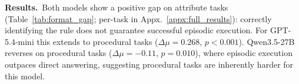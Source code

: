 \documentclass[11pt]{article}
\newcommand\jl[1]{\todo[color=blue!40]{{\bf Jessy}: #1}}
\begin{document}
%
%



\noindent\textbf{Results.}~Both models show a positive gap on attribute tasks (Table~\ref{tab:format_gap}; per-task in Appx.~\ref{appx:full_results}): correctly identifying the rule does not guarantee successful episodic execution. For GPT-5.4-mini this extends to procedural tasks ($\Delta\mu{=}0.268$, $p{<}0.001$). Qwen3.5-27B reverses on procedural tasks ($\Delta\mu{=}{-}0.11$, $p{=}0.010$), where episodic execution outpaces direct answering, suggesting procedural tasks are inherently harder for this model.
\end{document}

